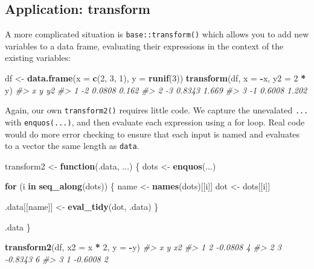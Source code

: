 \documentclass[]{book}
\makeatletter
\newenvironment{Shaded}{\begin{snugshade}}{\end{snugshade}}
\newcommand{\CommentTok}[1]{\textcolor[rgb]{0.37,0.37,0.37}{\textit{#1}}}
\newcommand{\ControlFlowTok}[1]{\textcolor[rgb]{0.27,0.27,0.27}{\textbf{#1}}}
\newcommand{\DataTypeTok}[1]{\textcolor[rgb]{0.27,0.27,0.27}{#1}}
\newcommand{\DecValTok}[1]{\textcolor[rgb]{0.06,0.06,0.06}{#1}}
\newcommand{\KeywordTok}[1]{\textcolor[rgb]{0.27,0.27,0.27}{\textbf{#1}}}
\newcommand{\NormalTok}[1]{#1}
\newcommand{\OperatorTok}[1]{\textcolor[rgb]{0.43,0.43,0.43}{\textbf{#1}}}
\newcommand{\StringTok}[1]{\textcolor[rgb]{0.5,0.5,0.5}{#1}}
\newcommand{\indexc}[1]{\index{#1@\texttt{#1}}}
\makeatother
\begin{document}
\hypertarget{application-transform}{%
\subsection{Application: transform}\label{application-transform}}

\indexc{transform()}

A more complicated situation is \texttt{base::transform()} which allows you to add new variables to a data frame, evaluating their expressions in the context of the existing variables:

\begin{Shaded}
\begin{Highlighting}[]
\NormalTok{df <-}\StringTok{ }\KeywordTok{data.frame}\NormalTok{(}\DataTypeTok{x =} \KeywordTok{c}\NormalTok{(}\DecValTok{2}\NormalTok{, }\DecValTok{3}\NormalTok{, }\DecValTok{1}\NormalTok{), }\DataTypeTok{y =} \KeywordTok{runif}\NormalTok{(}\DecValTok{3}\NormalTok{))}
\KeywordTok{transform}\NormalTok{(df, }\DataTypeTok{x =} \OperatorTok{-}\NormalTok{x, }\DataTypeTok{y2 =} \DecValTok{2} \OperatorTok{*}\StringTok{ }\NormalTok{y)}
\CommentTok{#>    x      y    y2}
\CommentTok{#> 1 -2 0.0808 0.162}
\CommentTok{#> 2 -3 0.8343 1.669}
\CommentTok{#> 3 -1 0.6008 1.202}
\end{Highlighting}
\end{Shaded}

Again, our own \texttt{transform2()} requires little code. We capture the unevalated \texttt{...} with \texttt{enquos(...)}, and then evaluate each expression using a for loop. Real code would do more error checking to ensure that each input is named and evaluates to a vector the same length as \texttt{data}.

\begin{Shaded}
\begin{Highlighting}[]
\NormalTok{transform2 <-}\StringTok{ }\ControlFlowTok{function}\NormalTok{(.data, ...) \{}
\NormalTok{  dots <-}\StringTok{ }\KeywordTok{enquos}\NormalTok{(...)}

  \ControlFlowTok{for}\NormalTok{ (i }\ControlFlowTok{in} \KeywordTok{seq_along}\NormalTok{(dots)) \{}
\NormalTok{    name <-}\StringTok{ }\KeywordTok{names}\NormalTok{(dots)[[i]]}
\NormalTok{    dot <-}\StringTok{ }\NormalTok{dots[[i]]}

\NormalTok{    .data[[name]] <-}\StringTok{ }\KeywordTok{eval_tidy}\NormalTok{(dot, .data)}
\NormalTok{  \}}

\NormalTok{  .data}
\NormalTok{\}}

\KeywordTok{transform2}\NormalTok{(df, }\DataTypeTok{x2 =}\NormalTok{ x }\OperatorTok{*}\StringTok{ }\DecValTok{2}\NormalTok{, }\DataTypeTok{y =} \OperatorTok{-}\NormalTok{y)}
\CommentTok{#>   x       y x2}
\CommentTok{#> 1 2 -0.0808  4}
\CommentTok{#> 2 3 -0.8343  6}
\CommentTok{#> 3 1 -0.6008  2}
\end{Highlighting}
\end{Shaded}
\end{document}
